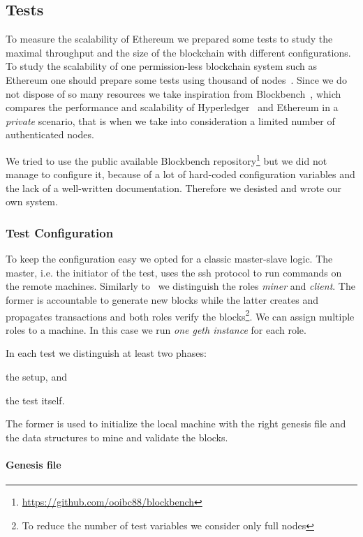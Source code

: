 \subsection{Tests}

To measure the scalability of Ethereum we prepared some tests to study
the maximal throughput and the size of the blockchain with different
configurations.
To study the scalability of one permission-less blockchain system such as
Ethereum one should prepare some tests using thousand of nodes~\cite{}.
Since we do not dispose of so many resources we take inspiration from
Blockbench~\cite{blockbench}, which compares the performance and scalability
of Hyperledger~\cite{} and Ethereum in a \emph{private} scenario, that is when 
we take into consideration a limited number of authenticated nodes.

We tried to use the public available Blockbench 
repository\footnote{\url{https://github.com/ooibc88/blockbench}}
but we did not manage to configure it, because of a lot of hard-coded
configuration variables and the lack of a well-written documentation.
Therefore we desisted and wrote our own system.


\subsubsection{Test Configuration}

To keep the configuration easy we opted for a classic master-slave logic.
The master, i.e. the initiator of the test, uses the ssh protocol
to run commands on the remote machines.
Similarly to~\cite{blockbench} we distinguish the roles \emph{miner} and
\emph{client}. The former is accountable to generate new blocks while the
latter creates and propagates transactions and both roles verify the 
blocks\footnote{To reduce the number of test variables we consider only 
	full nodes}.
We can assign multiple roles to a machine. In this case we run
\emph{one geth instance} for each role.



In each test we distinguish at least two phases:
\begin{enumerate*}
	\item the setup, and
	\item the test itself.
\end{enumerate*}
The former is used to initialize the local machine with the right genesis
file and the data structures to mine and validate the blocks.

\paragraph{Genesis file}

